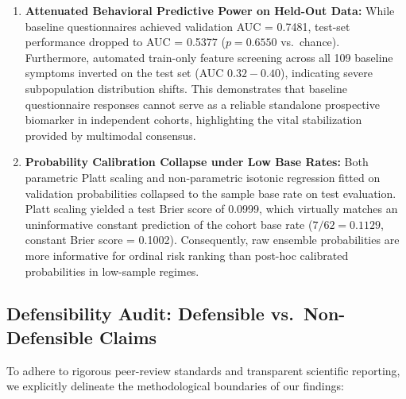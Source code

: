 \documentclass[10pt,letterpaper]{article}
\begin{document}
\begin{enumerate}
    \item \textbf{Attenuated Behavioral Predictive Power on Held-Out Data:} While baseline questionnaires achieved validation AUC = 0.7481, test-set performance dropped to AUC = 0.5377 ($p = 0.6550$ vs.\ chance). Furthermore, automated train-only feature screening across all 109 baseline symptoms inverted on the test set (AUC $0.32-0.40$), indicating severe subpopulation distribution shifts. This demonstrates that baseline questionnaire responses cannot serve as a reliable standalone prospective biomarker in independent cohorts, highlighting the vital stabilization provided by multimodal consensus.
    \item \textbf{Probability Calibration Collapse under Low Base Rates:} Both parametric Platt scaling and non-parametric isotonic regression fitted on validation probabilities collapsed to the sample base rate on test evaluation. Platt scaling yielded a test Brier score of 0.0999, which virtually matches an uninformative constant prediction of the cohort base rate ($7/62 = 0.1129$, constant Brier score = 0.1002). Consequently, raw ensemble probabilities are more informative for ordinal risk ranking than post-hoc calibrated probabilities in low-sample regimes.
\end{enumerate}

\subsection*{Defensibility Audit: Defensible vs.\ Non-Defensible Claims}

To adhere to rigorous peer-review standards and transparent scientific reporting, we explicitly delineate the methodological boundaries of our findings:
\end{document}
